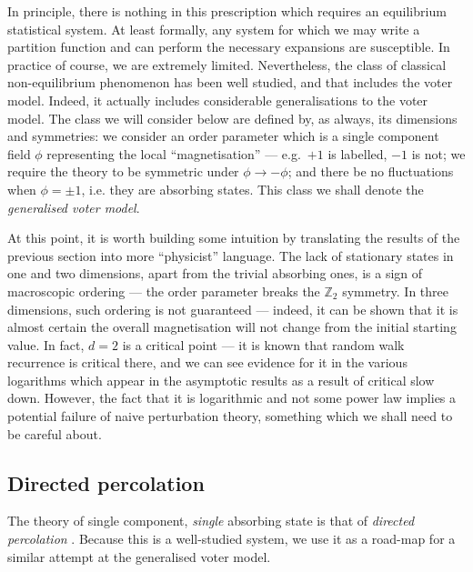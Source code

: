 \documentclass[10pt,english]{report}
\begin{document}
In principle, there is nothing in this prescription which requires an equilibrium statistical system. At least formally, any system for which we may write a partition function and can perform the necessary expansions are susceptible. In practice of course, we are extremely limited. Nevertheless, the class of classical non-equilibrium phenomenon has been well studied, and that includes the voter model. Indeed, it actually includes considerable generalisations to the voter model. The class we will consider below are defined by, as always, its dimensions and symmetries: we consider an order parameter which is a single component field $\phi$ representing the local ``magnetisation'' --- e.g.\ $+1$ is labelled, $-1$ is not; we require the theory to be symmetric under $\phi \rightarrow -\phi$; and there be no fluctuations when $\phi=\pm 1$, i.e. they are absorbing states. This class we shall denote the \emph{generalised voter model}.

At this point, it is worth building some intuition by translating the results of the previous section into more ``physicist'' language. The lack of stationary states in one and two dimensions, apart from the trivial absorbing ones, is a sign of macroscopic ordering --- the order parameter breaks the $\mathbb{Z}_2$ symmetry. In three dimensions, such ordering is not guaranteed --- indeed, it can be shown that it is almost certain the overall magnetisation will not change from the initial starting value. In fact, $d=2$ is a critical point --- it is known that random walk recurrence is critical there, and we can see evidence for it in the various logarithms which appear in the asymptotic results as a result of critical slow down. However, the fact that it is logarithmic and not some power law implies a potential failure of naive perturbation theory, something which we shall need to be careful about.

\subsection{Directed percolation}

The theory of single component, \emph{single} absorbing state is that of \emph{directed percolation} \citep[][section 10.6]{cardybook}. Because this is a well-studied system, we use it as a road-map for a similar attempt at the generalised voter model.
\end{document}

